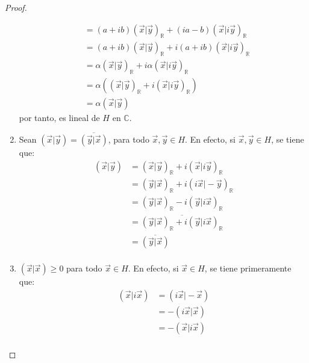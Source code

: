 \documentclass[12pt]{report}
\theoremstyle{largebreak}
\newcommand\pint[2]{\ensuremath{\left(#1\big|#2\right)}}
\newcommand\conj[1]{\ensuremath{\overline{#1}}}
\begin{document}
\begin{proof}
\begin{enumerate}
\begin{equation*}
\begin{split}
                    &=(a+ib)\pint{\vec{x}}{\vec{y}}_{\mathbb{R}}+(ia-b)\pint{\vec{x}}{i\vec{y}}_{\mathbb{R}}\\
                    &=(a+ib)\pint{\vec{x}}{\vec{y}}_{\mathbb{R}}+i(a+ib)\pint{\vec{x}}{i\vec{y}}_{\mathbb{R}}\\
                    &=\alpha\pint{\vec{x}}{\vec{y}}_{\mathbb{R}}+i\alpha\pint{\vec{x}}{i\vec{y}}_{\mathbb{R}}\\
                    &=\alpha(\pint{\vec{x}}{\vec{y}}_{\mathbb{R}}+i\pint{\vec{x}}{i\vec{y}}_{\mathbb{R}})\\
                    &=\alpha\pint{\vec{x}}{\vec{y}}
                \end{split}
            \end{equation*}
            por tanto, es lineal de $H$ en $\mathbb{C}$.
            \item Sean $\pint{\vec{x}}{\vec{y}}=\conj{\pint{\vec{y}}{\vec{x}}}$, para todo $\vec{x},\vec{y}\in H$. En efecto, si $\vec{x},\vec{y}\in H$, se tiene que:
            \begin{equation*}
                \begin{split}
                    \pint{\vec{x}}{\vec{y}}&=\pint{\vec{x}}{\vec{y}}_{\mathbb{R}}+i\pint{\vec{x}}{i\vec{y}}_{\mathbb{R}}\\
                    &=\pint{\vec{y}}{\vec{x}}_{\mathbb{R}}+i\pint{i\vec{x}}{-\vec{y}}_{\mathbb{R}}\\
                    &=\pint{\vec{y}}{\vec{x}}_{\mathbb{R}}-i\pint{\vec{y}}{i\vec{x}}_{\mathbb{R}}\\
                    &=\conj{\pint{\vec{y}}{\vec{x}}_{\mathbb{R}}+i\pint{\vec{y}}{i\vec{x}}_{\mathbb{R}}}\\
                    &=\conj{\pint{\vec{y}}{\vec{x}}}\\
                \end{split}
            \end{equation*}
            \item $\pint{\vec{x}}{\vec{x}}\geq 0$ para todo $\vec{x}\in H$. En efecto, si $\vec{x}\in H$, se tiene primeramente que:
            \begin{equation*}
                \begin{split}
                    \pint{\vec{x}}{i\vec{x}}&=\pint{i\vec{x}}{-\vec{x}}\\
                    &=-\pint{i\vec{x}}{\vec{x}}\\
                    &=-\pint{\vec{x}}{i\vec{x}}\\

\end{split}
\end{equation*}
\end{enumerate}
\end{proof}
\end{document}
